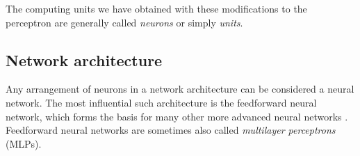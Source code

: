 The computing units we have obtained with these modifications to the perceptron are generally called \emph{neurons} or simply \emph{units}.

\begin{comment}
One common activation function is the \emph{logistic sigmoid}:

\begin{equation}
\sigma(x) = \frac1{1+e^{-x}}.
\end{equation}

\begin{figure}
	\begin{center}
		
	\end{center}
	\caption{The logistic sigmoid function.}
	\label{fig:sigmoid}
\end{figure}

As shown in Fig. \ref{fig:sigmoid}, $\sigma(x)$ squashes the output to a value between 0 and 1. A very similar function, producing an output between -1 and 1, is $\tanh(x)$. Lastly, one of the most commonly used activation functions is the \emph{rectified linear} function $g(x) = \max\{0,x\}$ plotted in Fig. \ref{fig:relu}.

\begin{figure}
	\begin{center}
		
	\end{center}
	\caption{The rectified linear function.}
	\label{fig:relu}
\end{figure}

The choice of activation function is an important design decision that can greatly influence how well the model learns. The rectified linear function is a very good default choice, as it has shown to outperform other functions in a variety of different model architectures \cite{DBLP:journals/jmlr/GlorotBB11 ,DBLP:conf/nips/KrizhevskySH12}. We will see why some functions work better than others in Section \ref{sec:training}.
\end{comment}

\subsection{Network architecture}
Any arrangement of neurons in a network architecture can be considered a neural network. The most influential such architecture is the feedforward neural network, which forms the basis for many other more advanced neural networks \cite[Ch.\,6,\,p.\,163]{DBLP:books/daglib/0040158}. Feedforward neural networks are sometimes also called \emph{multilayer perceptrons} (MLPs).

